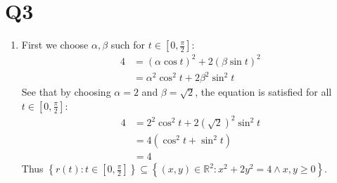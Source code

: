 \documentclass[a4paper, 11pt]{article}
\newcommand{\RR}{\mathbb{R}}
\def\set#1{\left\{ #1 \right\}}
\begin{document}
\pagebreak
\section*{Q3}
\begin{enumerate}[label=(\alph*)]
  \item First we choose $\alpha,\beta$ such for $t\in[0,\frac\pi2]$:
        \begin{align*}
          4 & = (\alpha\cos t)^2 + 2(\beta\sin t)^2  \\
            & = \alpha^2\cos^2 t  + 2\beta^2\sin^2 t
        \end{align*}
        See that by choosing $\alpha=2$ and $\beta=\sqrt 2$, the equation is satisfied for all $t\in[0,\frac\pi 2]$:
        \begin{align*}
          4 & = 2^2 \cos^2t + 2(\sqrt 2)^2\sin^2 t \\
            & = 4(\cos^2 t+\sin^2 t)               \\
            & = 4
        \end{align*}
        Thus $\set{r(t): t\in [0,\frac \pi2] }\subseteq \set{(x,y)\in\RR^2 : x^2 + 2y^2 = 4 \land x,y\geq0}$.





\end{enumerate}
\end{document}
